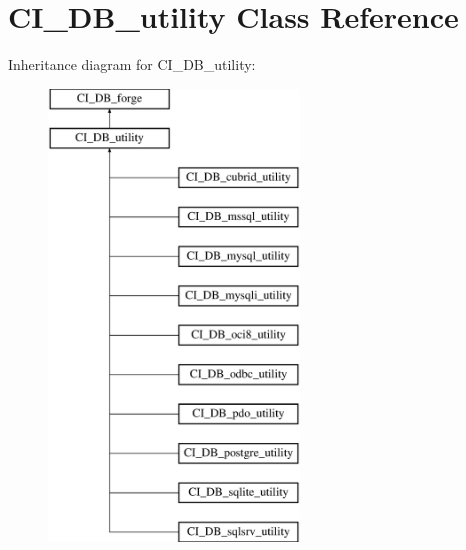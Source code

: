 \hypertarget{class_c_i___d_b__utility}{\section{C\-I\-\_\-\-D\-B\-\_\-utility Class Reference}
\label{class_c_i___d_b__utility}
}
Inheritance diagram for C\-I\-\_\-\-D\-B\-\_\-utility\-:\begin{figure}[H]
\begin{center}
\leavevmode
\includegraphics[height=12.000000cm]{class_c_i___d_b__utility}
\end{center}
\end{figure}
